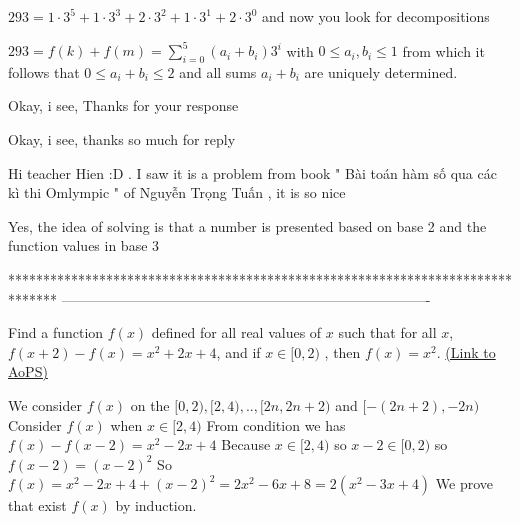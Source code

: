 \begin{mysolution}
	$ 293=1\cdot 3^5+1\cdot 3^3+2\cdot 3^2+1\cdot 3^1+2\cdot 3^0$ and now you look for decompositions

$ 293=f(k)+f(m)=\sum_{i=0}^5(a_i+b_i)3^i$ with $ 0\leq a_i,b_i\leq 1$ from which it follows that $ 0\leq a_i+b_i\leq 2$ and all sums $ a_i+b_i$ are uniquely determined.
\end{mysolution}



\begin{mysolution}
	Okay, i see, Thanks for your response
\end{mysolution}



\begin{mysolution}
	\begin{tcolorbox}Okay, i see, thanks so much for reply\end{tcolorbox}


Hi teacher Hien  :D . I saw it is a problem from book " Bài toán hàm số qua các kì thi Omlympic " of Nguyễn Trọng Tuấn , it is so nice  
\end{mysolution}



\begin{mysolution}
	Yes, the idea of solving is that a number is presented based on base 2 and the function values in base 3
\end{mysolution}
*******************************************************************************
-------------------------------------------------------------------------------

\begin{problem}
	Find a function $ f(x)$ defined for all real values of $ x$ such that
for all $ x$, $ f(x+ 2) - f(x) = x^2 + 2x + 4$,
and if $ x \in [0,2)$ , then $ f(x) = x^2.$
	\flushright \href{https://artofproblemsolving.com/community/c6h168981}{(Link to AoPS)}
\end{problem}



\begin{mysolution}
	We consider $ f(x)$ on the $ [0,2),[2,4),..,[2n,2n+2)$ and $ [-(2n+2),-2n)$
Consider $ f(x)$ when $ x\in [2,4)$
From condition we has
$ f(x)-f(x-2)=x^2-2x+4$
Because $ x\in [2,4)$ so $ x-2\in [0,2)$ so $ f(x-2)=(x-2)^2$
So $ f(x)=x^2-2x+4+(x-2)^2=2x^2-6x+8=2(x^2-3x+4)$
We prove that  exist $ f(x)$ by induction.
\end{mysolution}



